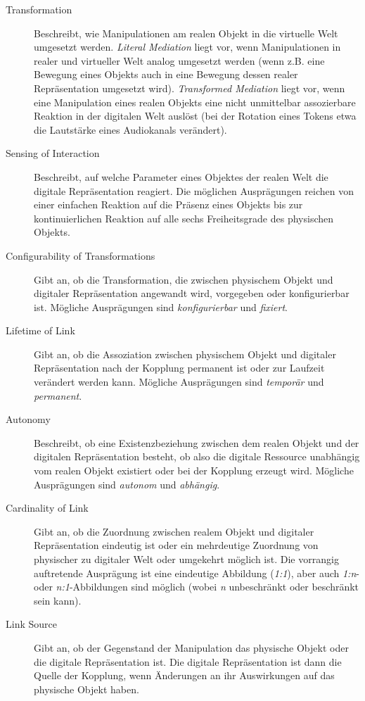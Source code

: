 \begin{description}
	\item[Transformation] Beschreibt, wie Manipulationen am realen Objekt in die virtuelle Welt umgesetzt werden. \emph{Literal Mediation} liegt vor, wenn Manipulationen in realer und virtueller Welt analog umgesetzt werden (wenn z.B. eine Bewegung eines Objekts auch in eine Bewegung dessen realer Repräsentation umgesetzt wird). \emph{Transformed Mediation} liegt vor, wenn eine Manipulation eines realen Objekts eine nicht unmittelbar assozierbare Reaktion in der digitalen Welt auslöst (bei der Rotation eines Tokens etwa die Lautstärke eines Audiokanals verändert).
	\item[Sensing of Interaction] Beschreibt, auf welche Parameter eines Objektes der realen Welt die digitale Repräsentation reagiert. Die möglichen Ausprägungen reichen von einer einfachen Reaktion auf die Präsenz eines Objekts bis zur kontinuierlichen Reaktion auf alle sechs Freiheitsgrade des physischen Objekts.
	\item[Configurability of Transformations] Gibt an, ob die Transformation, die zwischen physischem Objekt und digitaler Repräsentation angewandt wird, vorgegeben oder konfigurierbar ist. Mögliche Ausprägungen sind \emph{konfigurierbar} und \emph{fixiert}.
	\item[Lifetime of Link] Gibt an, ob die Assoziation zwischen physischem Objekt und digitaler Repräsentation nach der Kopplung permanent ist oder zur Laufzeit verändert werden kann. Mögliche Ausprägungen sind \emph{temporär} und \emph{permanent}.
	\item[Autonomy] Beschreibt, ob eine Existenzbeziehung zwischen dem realen Objekt und der digitalen Repräsentation besteht, ob also die digitale Ressource unabhängig vom realen Objekt existiert oder bei der Kopplung erzeugt wird. Mögliche Ausprägungen sind \emph{autonom} und \emph{abhängig}.
	\item[Cardinality of Link] Gibt an, ob die Zuordnung zwischen realem Objekt und digitaler Repräsentation eindeutig ist oder ein mehrdeutige Zuordnung von physischer zu digitaler Welt oder umgekehrt möglich ist. Die vorrangig auftretende Ausprägung ist eine eindeutige Abbildung (\emph{1:1}), aber auch \emph{1:n}- oder \emph{n:1}-Abbildungen sind möglich (wobei \emph{n} unbeschränkt oder beschränkt sein kann).
	\item[Link Source] Gibt an, ob der Gegenstand der Manipulation das physische Objekt oder die digitale Repräsentation ist. Die digitale Repräsentation ist dann die Quelle der Kopplung, wenn Änderungen an ihr Auswirkungen auf das physische Objekt haben.
\end{description}

